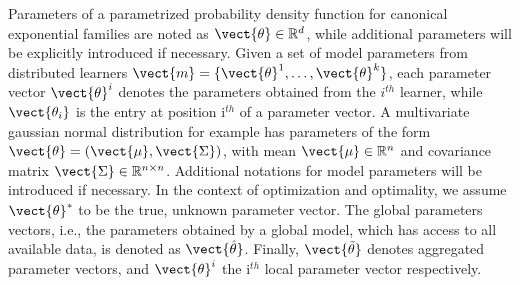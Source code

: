     Parameters of a parametrized probability density function for canonical exponential families are noted as $\vect{\theta} \in \mathbb{R}^d$, while additional parameters will be explicitly introduced if necessary.
    Given a set of model parameters from distributed learners $\vect{m} = \{\vect{\theta}^1,  \ldots, \vect{\theta}^k\}$, each parameter vector $\vect{\theta}^i$ denotes the parameters obtained from the  $i^{th}$ learner, while $\vect{\theta_i}$ is the entry at position i$^{th}$ of a parameter vector.
    A multivariate gaussian normal distribution for example has parameters of the form $\vect{\theta} = (\vect{\mu}, \vect{\Sigma})$, with mean $\vect{\mu} \in \mathbb{R}^{n}$ and covariance matrix $\vect{\Sigma} \in \mathbb{R}^{n \times n}$.
    Additional notations for model parameters will be introduced if necessary.
    In the context of optimization and optimality, we assume $\vect{\theta}^*$ to be the true, unknown parameter vector.
    The global parameters vectors, i.e., the parameters obtained by a global model, which has access to all available data, is denoted as  $\vect{\hat{\theta}}$.
    Finally, $\vect{\tilde{\theta}}$ denotes aggregated parameter vectors, and $\vect{\theta}^{i}$ the i$^{th}$ local parameter vector respectively.

